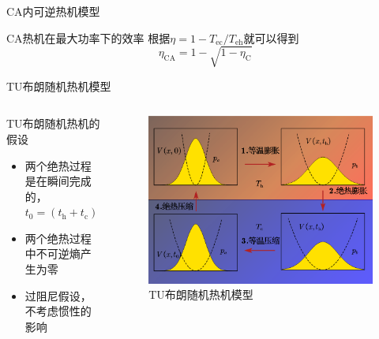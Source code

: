 \documentclass{beamer}
\begin{document}
\begin{frame}{CA内可逆热机模型}
    \begin{alertblock}{CA热机在最大功率下的效率}
        根据$\eta=1-T_{\mathrm{ec}} / T_{\mathrm{eh}}$就可以得到
        \begin{equation}
            \eta _{\mathrm{CA}}=1-\sqrt{1-\eta _{\mathrm{C}}}
            \label{eq4}
        \end{equation}
    \end{alertblock}
\end{frame}

\begin{frame}{TU布朗随机热机模型}
    \begin{columns}
        \begin{column}{.62\textwidth}
            \begin{exampleblock}{TU布朗随机热机的假设}
                \begin{itemize}
                    \item<2->  两个绝热过程是在瞬间完成的，$t_0 = (t_{\mathrm{h}}+t_{\mathrm{c}})$
                    \item<3->  两个绝热过程中不可逆熵产生为零
                    \item<4->  过阻尼假设，不考虑惯性的影响
                \end{itemize}         
            \end{exampleblock}
        \end{column}
    
        \begin{column}{.38\textwidth}
            \onslide
            \begin{figure}
                \begin{center}
                    \includegraphics[width=\textwidth]{p2.png}
                \end{center}
                \caption{TU布朗随机热机模型}
                \label{f2}
            \end{figure}
        \end{column}
    \end{columns}
\end{frame}
\end{document}
